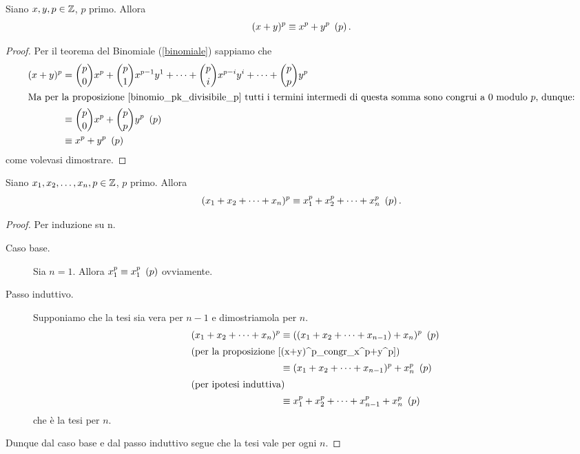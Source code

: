\begin{proposition}\label{(x+y)^p_congr_x^p+y^p}
    Siano $x, y, p \in \mathbb{Z}$, $p$ primo. Allora
    \begin{equation}
        (x+y)^p \equiv x^p + y^p \ \left(p\right).
    \end{equation}
\end{proposition}
\begin{proof}
    Per il teorema del Binomiale (\ref{binomiale}) sappiamo che
    \begin{alignat*}{1}
        (x+y)^p &= \binom{p}{0}x^p + \binom{p}{1}x^{p-1}y^1 + \dots + \binom{p}{i}x^{p-i}y^i + \dots + \binom{p}{p}y^p \\
        \intertext{Ma per la proposizione \ref{binomio_pk_divisibile_p} tutti i termini intermedi di questa somma sono congrui a $0$ modulo $p$, dunque:}
        &\equiv \binom{p}{0}x^p + \binom{p}{p}y^p \ \left(p\right)\\
        &\equiv x^p + y^p \ \left(p\right)
    \end{alignat*}
    come volevasi dimostrare.
\end{proof}

\begin{corollary}\label{(x_1+x_n)^p_congr_x_1^p+x_n^p}
    Siano $x_1, x_2, \dots, x_n, p \in \mathbb{Z}$, $p$ primo. Allora
    \begin{equation}
        (x_1+x_2+\dots+x_n)^p \equiv x_1^p + x_2^p + \dots + x_n^p \ \left(p\right).
    \end{equation}
\end{corollary}
\begin{proof}
    Per induzione su n.
    \begin{description}
        \item[Caso base.]

        Sia $n = 1$. Allora $x_1^p \equiv x_1^p \ \left(p\right)$ ovviamente.
        \item[Passo induttivo.]
        
        Supponiamo che la tesi sia vera per $n-1$ e dimostriamola per $n$.
        \begin{alignat*}{1}
            (x_1+x_2+\dots+x_n)^p &\equiv ((x_1+x_2+\dots+x_{n-1})+x_n)^p \ \left(p\right)\\
            \intertext{(per la proposizione \ref{(x+y)^p_congr_x^p+y^p})}
            &\equiv (x_1+x_2+\dots+x_{n-1})^p+x_n^p\ \left(p\right)\\
            \intertext{(per ipotesi induttiva)}
            &\equiv x_1^p + x_2^p + \dots + x_{n-1}^p + x_n^p\ \left(p\right)
        \end{alignat*}
        che è la tesi per $n$.
    \end{description}
    Dunque dal caso base e dal passo induttivo segue che la tesi vale per ogni $n$.
\end{proof}

